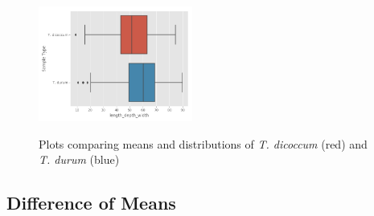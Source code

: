 \documentclass[11pt]{report}
\begin{document}
\begin{figure}[!ht]
{    \includegraphics[width=0.45\textwidth]{./images/results/group5/length_depth_width.png}
    }
  \caption{Plots comparing means and distributions of \textit{T. dicoccum} (red) and \textit{T. durum} (blue)}
  \label{fig:dummy}
\end{figure}
\clearpage
\subsection{Difference of Means}
\label{sec:orgf46b279}
\end{document}
